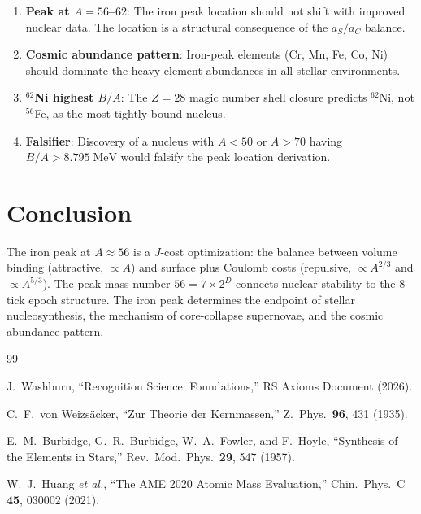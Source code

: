 \documentclass[12pt,a4paper]{article}
\theoremstyle{definition}
\theoremstyle{remark}
\begin{document}
\begin{enumerate}
  \item \textbf{Peak at $A = 56$--$62$}: The iron peak location
  should not shift with improved nuclear data.  The location is a
  structural consequence of the $a_S/a_C$ balance.

  \item \textbf{Cosmic abundance pattern}: Iron-peak elements (Cr,
  Mn, Fe, Co, Ni) should dominate the heavy-element abundances in
  all stellar environments.

  \item \textbf{$^{62}$Ni highest $B/A$}: The $Z = 28$ magic
  number shell closure predicts $^{62}$Ni, not $^{56}$Fe, as the
  most tightly bound nucleus.

  \item \textbf{Falsifier}: Discovery of a nucleus with $A < 50$
  or $A > 70$ having $B/A > 8.795\;\mathrm{MeV}$ would falsify
  the peak location derivation.
\end{enumerate}

\section{Conclusion}
\label{sec:conclusion}

The iron peak at $A \approx 56$ is a $J$-cost optimization:
the balance between volume binding (attractive, $\propto A$) and
surface plus Coulomb costs (repulsive, $\propto A^{2/3}$ and
$\propto A^{5/3}$).  The peak mass number $56 = 7 \times 2^D$
connects nuclear stability to the 8-tick epoch structure.  The
iron peak determines the endpoint of stellar nucleosynthesis, the
mechanism of core-collapse supernovae, and the cosmic abundance
pattern.

\begin{thebibliography}{99}

J.~Washburn, ``Recognition Science: Foundations,''
RS Axioms Document (2026).

C.~F.~von Weizs\"acker, ``Zur Theorie der Kernmassen,'' Z.\
Phys.\ \textbf{96}, 431 (1935).

E.~M.~Burbidge, G.~R.~Burbidge, W.~A.~Fowler, and F.~Hoyle,
``Synthesis of the Elements in Stars,'' Rev.\ Mod.\ Phys.\
\textbf{29}, 547 (1957).

W.~J.~Huang \emph{et al.}, ``The AME 2020 Atomic Mass
Evaluation,'' Chin.\ Phys.\ C \textbf{45}, 030002 (2021).

\end{thebibliography}
\end{document}
